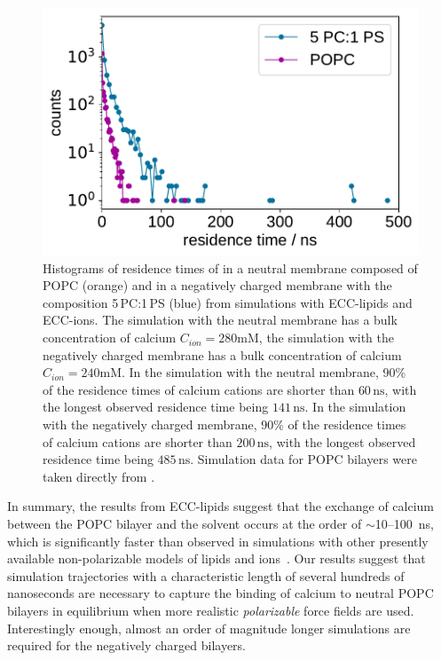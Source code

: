 \documentclass[journal=jpcbfk,manuscript=article]{achemso}
\newlength{\figwidth}
\begin{document}
\begin{figure}[tb!]
  \centering
  \includegraphics[width=\figwidth]{../img/histogram_bound_times_26CaCl2_comparison_PC-PCPS.pdf}
  \caption{\label{fig:hist_residence_times}
   Histograms of residence times of  
   in a neutral membrane composed of POPC (orange)
   and in a negatively charged membrane with the composition 5\,PC:1\,PS (blue)
   from simulations with ECC-lipids and ECC-ions.
   The simulation with the neutral membrane has a bulk concentration of calcium $C_{ion} = 280\mathrm{mM}$, 
   the simulation with the negatively charged membrane has a bulk concentration of calcium $C_{ion} = 240\mathrm{mM}$. 
   In the simulation with the neutral membrane, 
   90\% of the residence times of calcium cations are
   shorter than $60\,\mathrm{ns}$, %
   with the longest observed residence time being $141\,\mathrm{ns}$. 
   In the simulation with the negatively charged membrane, 
   90\% of the residence times of calcium cations are
   shorter than $200\,\mathrm{ns}$, %
   with the longest observed residence time being $485\,\mathrm{ns}$. 
   Simulation data for POPC bilayers were taken directly from \cite{melcr18}. 
   }
\end{figure}


In summary, the results from ECC-lipids suggest 
that the exchange of calcium between the POPC bilayer and the solvent 
occurs at the order of $\sim$10--100~ns, 
which is significantly faster than observed in simulations 
with other presently available non-polarizable models of lipids and ions~\citep{javanainen17, catte16}. 
Our results suggest 
that simulation trajectories with a characteristic length of several hundreds of nanoseconds 
are necessary to capture the binding of calcium to neutral POPC bilayers 
in equilibrium when more realistic \emph{polarizable} force fields are used. 
Interestingly enough, almost an order of magnitude longer simulations
are required for the negatively charged bilayers. 
 
\end{document}
